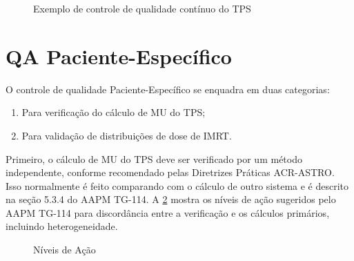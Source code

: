 \documentclass[11pt,a4paper]{article}
\begin{document}
	\begin{figure}[h]
		\centering
		\caption{Exemplo de controle de qualidade contínuo do TPS}
		\label{fig:qaTps}
	\end{figure}

\section{QA Paciente-Específico}

	O controle de qualidade Paciente-Específico se enquadra em duas categorias:

	\begin{enumerate}[label=\textcolor{CarnationPink}{\roman*.}]
		\item Para verificação do cálculo de MU do TPS;
		\item Para validação de distribuições de dose de IMRT.
	\end{enumerate}

	Primeiro, o cálculo de MU do TPS deve ser verificado por um método independente, conforme recomendado pelas Diretrizes Práticas ACR-ASTRO. Isso normalmente é feito comparando com o cálculo de outro sistema e é descrito na seção 5.3.4 do AAPM TG-114. A \ref{fig:niveisAcaoMu} mostra os níveis de ação sugeridos pelo AAPM TG-114 para discordância entre a verificação e os cálculos primários, incluindo heterogeneidade.
	
	\begin{figure}[h]
		\centering
		\caption{Níveis de Ação}
		\label{fig:niveisAcaoMu}
	\end{figure}
\end{document}
